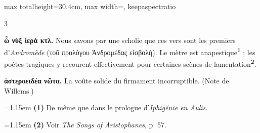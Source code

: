 \documentclass[11pt,twoside]{book}
\newcommand{\italique}[1]{\textit{#1}}
\newcommand{\marqueur}[1]{\textsuperscript{\color{rubricRed}\textbf{#1}}}
\begin{document}
\begin{adjustbox}{max totalheight=30.4cm, max width=\textwidth, keepaspectratio}
\begin{minipage}{\textwidth}
{\begin{multicols}{3}
\par\vspace{1.5pt}
 \textbf{ὦ νὺξ ἱερὰ κτλ.} Nous savons par une scholie que ces vers sont les premiers d'\italique{Andromède} (τοῦ προλόγου Ἀνδρομέδας εἰσβολή). Le mètre est anapestique\marqueur{1} ; les poètes tragiques y recourent effectivement pour certaines scènes de lamentation\marqueur{2}.
\par\vspace{1.5pt}
 \textbf{ἀστεροειδέα νῶτα.} La voûte solide du firmament incorruptible. (Note de Willems.)
\par\vspace{1.5pt}
\par\vspace{1.2pt}\par\nopagebreak\vspace{1pt}\noindent\hangindent=1.15em {\color{sepiaNote}\textbf{(1)}} De même que dans le prologue d'\italique{Iphigénie en Aulis}.
\par\vspace{1.5pt}
\noindent\hangindent=1.15em {\color{sepiaNote}\textbf{(2)}} Voir \italique{The Songs of Aristophanes}, p. 57.
\par\end{multicols}}
\end{minipage}\end{adjustbox}
\newpage
\end{document}

